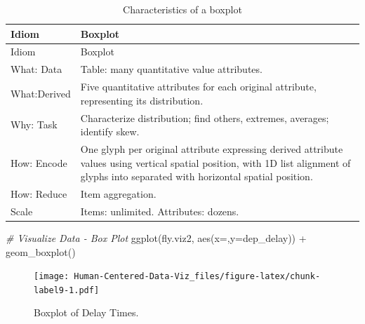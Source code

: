 \documentclass[
]{book}
\newenvironment{Shaded}{\begin{snugshade}}{\end{snugshade}}
\newcommand{\AttributeTok}[1]{\textcolor[rgb]{0.77,0.63,0.00}{#1}}
\newcommand{\CommentTok}[1]{\textcolor[rgb]{0.56,0.35,0.01}{\textit{#1}}}
\newcommand{\FunctionTok}[1]{\textcolor[rgb]{0.00,0.00,0.00}{#1}}
\newcommand{\NormalTok}[1]{#1}
\newcommand{\SpecialCharTok}[1]{\textcolor[rgb]{0.00,0.00,0.00}{#1}}
\newcommand{\StringTok}[1]{\textcolor[rgb]{0.31,0.60,0.02}{#1}}
\begin{document}
\begin{longtable}[]{@{}
  >{\raggedright\arraybackslash}p{}
  >{\raggedright\arraybackslash}p{}@{}}
\caption{Characteristics of a boxplot \citep{munzner2014visualization}}\tabularnewline
\toprule
Idiom & Boxplot \\
\midrule
\endfirsthead
\toprule
Idiom & Boxplot \\
\midrule
\endhead
What: Data & Table: many quantitative value attributes. \\
What:Derived & Five quantitative attributes for each original attribute, representing its distribution. \\
Why: Task & Characterize distribution; find others, extremes, averages; identify skew. \\
How: Encode & One glyph per original attribute expressing derived attribute values using vertical spatial position, with 1D list alignment of glyphs into separated with horizontal spatial position. \\
How: Reduce & Item aggregation. \\
Scale & Items: unlimited. Attributes: dozens. \\
\bottomrule
\end{longtable}

\begin{Shaded}
\begin{Highlighting}[]
\CommentTok{\# Visualize Data {-} Box Plot }
\FunctionTok{ggplot}\NormalTok{(fly.viz2, }\FunctionTok{aes}\NormalTok{(}\AttributeTok{x=}\StringTok{\textquotesingle{}\textquotesingle{}}\NormalTok{,}\AttributeTok{y=}\NormalTok{dep\_delay)) }\SpecialCharTok{+} \FunctionTok{geom\_boxplot}\NormalTok{()}
\end{Highlighting}
\end{Shaded}

\begin{figure}
\centering
\texttt{[image: Human-Centered-Data-Viz\_files/figure-latex/chunk-label9-1.pdf]}
\caption{\label{fig:chunk-label9}Boxplot of Delay Times.}
\end{figure}
\end{document}
